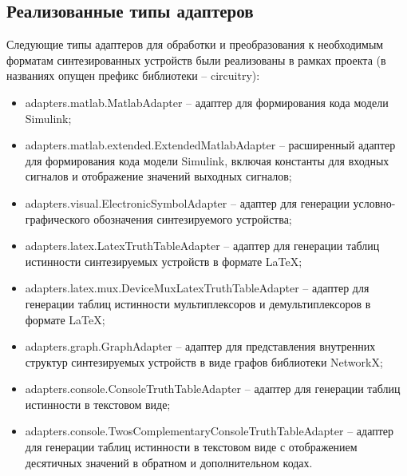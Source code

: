 \documentclass[document.tex]{subfiles}
\begin{document}
\subsection{Реализованные типы адаптеров}
Следующие типы адаптеров для обработки и преобразования к необходимым форматам
синтезированных устройств были реализованы в рамках проекта (в
названиях опущен префикс библиотеки -- circuitry):
\begin{itemize}[noitemsep]
  \item adapters.matlab.MatlabAdapter -- адаптер для формирования кода модели
  Simulink;
  \item adapters.matlab.extended.ExtendedMatlabAdapter -- расширенный адаптер
  для формирования кода модели Simulink, включая константы для входных сигналов
  и отображение значений выходных сигналов;
  \item adapters.visual.ElectronicSymbolAdapter -- адаптер для генерации
  условно-графического обозначения синтезируемого устройства;
  \item adapters.latex.LatexTruthTableAdapter -- адаптер для генерации таблиц
  истинности синтезируемых устройств в формате \LaTeX;
  \item adapters.latex.mux.DeviceMuxLatexTruthTableAdapter -- адаптер для
  генерации таблиц истинности мультиплексоров и демультиплексоров в формате
  \LaTeX;
  \item adapters.graph.GraphAdapter -- адаптер для представления внутренних
  структур синтезируемых устройств в виде графов библиотеки NetworkX;
  \item adapters.console.ConsoleTruthTableAdapter -- адаптер для генерации
  таблиц истинности в текстовом виде;
  \item adapters.console.TwosComplementaryConsoleTruthTableAdapter -- адаптер
  для генерации таблиц истинности в текстовом виде с отображением десятичных
  значений в обратном и дополнительном кодах.
\end{itemize}
\end{document}

